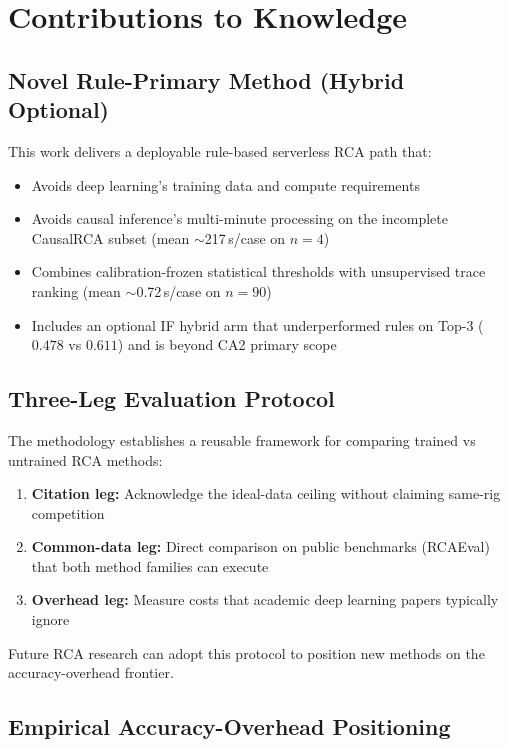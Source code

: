 \section{Contributions to Knowledge}

\subsection{Novel Rule-Primary Method (Hybrid Optional)}

This work delivers a deployable rule-based serverless RCA path that:
\begin{itemize}
    \item Avoids deep learning's training data and compute requirements
    \item Avoids causal inference's multi-minute processing on the incomplete CausalRCA subset (mean $\sim$217\,s/case on $n{=}4$)
    \item Combines calibration-frozen statistical thresholds with unsupervised trace ranking (mean $\sim$0.72\,s/case on $n{=}90$)
    \item Includes an optional IF hybrid arm that underperformed rules on Top-3 ($0.478$ vs $0.611$) and is beyond CA2 primary scope
\end{itemize}

\subsection{Three-Leg Evaluation Protocol}

The methodology establishes a reusable framework for comparing trained vs untrained RCA methods:
\begin{enumerate}
    \item \textbf{Citation leg:} Acknowledge the ideal-data ceiling without claiming same-rig competition
    \item \textbf{Common-data leg:} Direct comparison on public benchmarks (RCAEval) that both method families can execute
    \item \textbf{Overhead leg:} Measure costs that academic deep learning papers typically ignore
\end{enumerate}

Future RCA research can adopt this protocol to position new methods on the accuracy-overhead frontier.

\subsection{Empirical Accuracy-Overhead Positioning}

